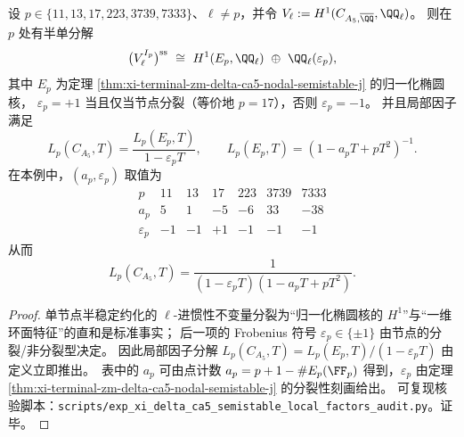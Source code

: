 \begin{corollary}\label{cor:xi-terminal-zm-delta-ca5-local-factor-ap-eps}
设 \(p\in\{11,13,17,223,3739,7333\}\)、\(\ell\neq p\)，并令
\(
V_\ell:=H^1(C_{A_5,\overline{\QQ}},\QQ_\ell)
\)。
则在 \(p\) 处有半单分解
\[
\bigl(V_\ell^{I_p}\bigr)^{\mathrm{ss}}
\ \cong\
H^1(E_p,\QQ_\ell)\ \oplus\ \QQ_\ell(\varepsilon_p),
\]
其中 \(E_p\) 为定理 \ref{thm:xi-terminal-zm-delta-ca5-nodal-semistable-j} 的归一化椭圆核，
\(\varepsilon_p=+1\) 当且仅当节点分裂（等价地 \(p=17\)），否则 \(\varepsilon_p=-1\)。
并且局部因子满足
\[
L_p(C_{A_5},T)=\frac{L_p(E_p,T)}{1-\varepsilon_p T},
\qquad
L_p(E_p,T)=(1-a_pT+pT^2)^{-1}.
\]
在本例中，\((a_p,\varepsilon_p)\) 取值为
\[
\begin{array}{c|cccccc}
p & 11 & 13 & 17 & 223 & 3739 & 7333\\ \hline
a_p & 5 & 1 & -5 & -6 & 33 & -38\\
\varepsilon_p & -1 & -1 & +1 & -1 & -1 & -1
\end{array}
\]
从而
\[
L_p(C_{A_5},T)=\frac{1}{(1-\varepsilon_pT)(1-a_pT+pT^2)}.
\]
\end{corollary}
\begin{proof}
单节点半稳定约化的 \(\ell\)-进惯性不变量分裂为“归一化椭圆核的 \(H^1\)”与“一维环面特征”的直和是标准事实；
后一项的 Frobenius 符号 \(\varepsilon_p\in\{\pm 1\}\) 由节点的分裂/非分裂型决定。
因此局部因子分解 \(L_p(C_{A_5},T)=L_p(E_p,T)/(1-\varepsilon_p T)\) 由定义立即推出。\
表中的 \(a_p\) 可由点计数
\(
a_p=p+1-\#E_p(\FF_p)
\)
得到，\(\varepsilon_p\) 由定理 \ref{thm:xi-terminal-zm-delta-ca5-nodal-semistable-j} 的分裂性刻画给出。
可复现核验脚本：\texttt{scripts/exp\_xi\_delta\_ca5\_semistable\_local\_factors\_audit.py}。证毕。
\end{proof}

